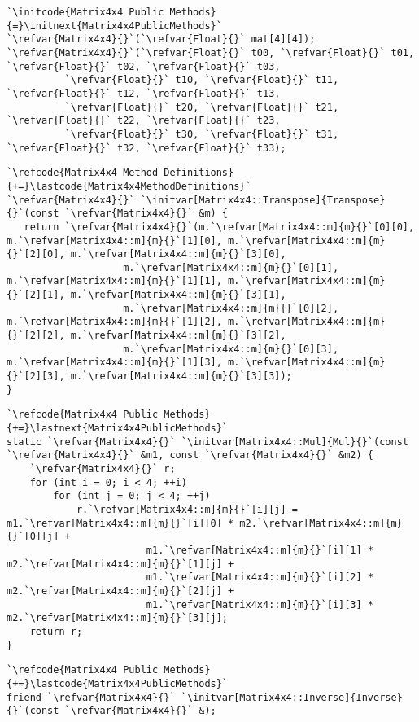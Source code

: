 \begin{lstlisting}
`\initcode{Matrix4x4 Public Methods}{=}\initnext{Matrix4x4PublicMethods}`
`\refvar{Matrix4x4}{}`(`\refvar{Float}{}` mat[4][4]);
`\refvar{Matrix4x4}{}`(`\refvar{Float}{}` t00, `\refvar{Float}{}` t01, `\refvar{Float}{}` t02, `\refvar{Float}{}` t03,
          `\refvar{Float}{}` t10, `\refvar{Float}{}` t11, `\refvar{Float}{}` t12, `\refvar{Float}{}` t13,
          `\refvar{Float}{}` t20, `\refvar{Float}{}` t21, `\refvar{Float}{}` t22, `\refvar{Float}{}` t23,
          `\refvar{Float}{}` t30, `\refvar{Float}{}` t31, `\refvar{Float}{}` t32, `\refvar{Float}{}` t33);
\end{lstlisting}

\begin{lstlisting}
`\refcode{Matrix4x4 Method Definitions}{+=}\lastcode{Matrix4x4MethodDefinitions}`
`\refvar{Matrix4x4}{}` `\initvar[Matrix4x4::Transpose]{Transpose}{}`(const `\refvar{Matrix4x4}{}` &m) {
   return `\refvar{Matrix4x4}{}`(m.`\refvar[Matrix4x4::m]{m}{}`[0][0], m.`\refvar[Matrix4x4::m]{m}{}`[1][0], m.`\refvar[Matrix4x4::m]{m}{}`[2][0], m.`\refvar[Matrix4x4::m]{m}{}`[3][0],
                    m.`\refvar[Matrix4x4::m]{m}{}`[0][1], m.`\refvar[Matrix4x4::m]{m}{}`[1][1], m.`\refvar[Matrix4x4::m]{m}{}`[2][1], m.`\refvar[Matrix4x4::m]{m}{}`[3][1],
                    m.`\refvar[Matrix4x4::m]{m}{}`[0][2], m.`\refvar[Matrix4x4::m]{m}{}`[1][2], m.`\refvar[Matrix4x4::m]{m}{}`[2][2], m.`\refvar[Matrix4x4::m]{m}{}`[3][2],
                    m.`\refvar[Matrix4x4::m]{m}{}`[0][3], m.`\refvar[Matrix4x4::m]{m}{}`[1][3], m.`\refvar[Matrix4x4::m]{m}{}`[2][3], m.`\refvar[Matrix4x4::m]{m}{}`[3][3]);
}
\end{lstlisting}

\begin{lstlisting}
`\refcode{Matrix4x4 Public Methods}{+=}\lastnext{Matrix4x4PublicMethods}`
static `\refvar{Matrix4x4}{}` `\initvar[Matrix4x4::Mul]{Mul}{}`(const `\refvar{Matrix4x4}{}` &m1, const `\refvar{Matrix4x4}{}` &m2) {
    `\refvar{Matrix4x4}{}` r;
    for (int i = 0; i < 4; ++i)
        for (int j = 0; j < 4; ++j)
            r.`\refvar[Matrix4x4::m]{m}{}`[i][j] = m1.`\refvar[Matrix4x4::m]{m}{}`[i][0] * m2.`\refvar[Matrix4x4::m]{m}{}`[0][j] + 
                        m1.`\refvar[Matrix4x4::m]{m}{}`[i][1] * m2.`\refvar[Matrix4x4::m]{m}{}`[1][j] + 
                        m1.`\refvar[Matrix4x4::m]{m}{}`[i][2] * m2.`\refvar[Matrix4x4::m]{m}{}`[2][j] + 
                        m1.`\refvar[Matrix4x4::m]{m}{}`[i][3] * m2.`\refvar[Matrix4x4::m]{m}{}`[3][j];
    return r;
}
\end{lstlisting}

\begin{lstlisting}
`\refcode{Matrix4x4 Public Methods}{+=}\lastcode{Matrix4x4PublicMethods}`
friend `\refvar{Matrix4x4}{}` `\initvar[Matrix4x4::Inverse]{Inverse}{}`(const `\refvar{Matrix4x4}{}` &);
\end{lstlisting}